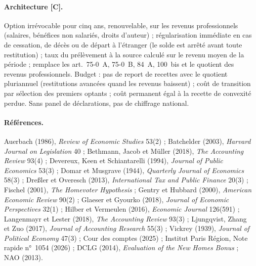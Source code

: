 \paragraph{Architecture [C].} Option irrévocable pour cinq ans, renouvelable, sur les revenus professionnels (salaires,
bénéfices non salariés, droits d'auteur) ; régularisation immédiate en cas de cessation, de décès ou de départ à
l'étranger (le solde est arrêté avant toute restitution) ; taux du prélèvement à la source calculé sur le revenu moyen
de la période ; remplace les art.~75-0~A, 75-0~B, 84~A, 100~bis et le quotient des revenus professionnels. Budget :
pas de report de recettes avec le quotient pluriannuel (restitutions avancées quand les revenus baissent) ; coût de
transition par sélection des premiers optants ; coût permanent égal à la recette de convexité perdue. Sans panel de
déclarations, pas de chiffrage national.

\paragraph{Références.} Auerbach (1986), \emph{Review of Economic Studies} 53(2) ; Batchelder (2003), \emph{Harvard
Journal on Legislation} 40 ; Bethmann, Jacob et Müller (2018), \emph{The Accounting Review} 93(4) ; Devereux, Keen et
Schiantarelli (1994), \emph{Journal of Public Economics} 53(3) ; Domar et Musgrave (1944), \emph{Quarterly Journal of
Economics} 58(3) ; Dreßler et Overesch (2013), \emph{International Tax and Public Finance} 20(3) ; Fischel (2001),
\emph{The Homevoter Hypothesis} ; Gentry et Hubbard (2000), \emph{American Economic Review} 90(2) ; Glaeser et Gyourko
(2018), \emph{Journal of Economic Perspectives} 32(1) ; Hilber et Vermeulen (2016), \emph{Economic Journal} 126(591) ;
Langenmayr et Lester (2018), \emph{The Accounting Review} 93(3) ; Ljungqvist, Zhang et Zuo (2017), \emph{Journal of
Accounting Research} 55(3) ; Vickrey (1939), \emph{Journal of Political Economy} 47(3) ; Cour des comptes (2025) ;
Institut Paris Région, Note rapide n°~1054 (2026) ; DCLG (2014), \emph{Evaluation of the New Homes Bonus} ; NAO (2013).
